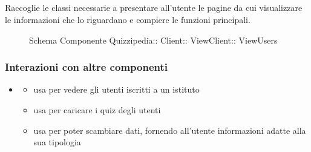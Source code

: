 \subsection{}
Raccoglie le classi necessarie a presentare all'utente le pagine da cui visualizzare le informazioni che lo riguardano e compiere le funzioni principali.
\begin{figure}[H]
\centering
\noindent{}
\caption[Schema Componente ViewUsers]{Schema Componente Quizzipedia:: Client:: ViewClient:: ViewUsers}
\end{figure}
\subsubsection{Interazioni con altre componenti}
\begin{itemize}
\item {}
\begin{itemize}
\item usa  per vedere gli utenti iscritti a un istituto
\item usa  per caricare i quiz degli utenti
\item usa  per poter scambiare dati, fornendo all'utente informazioni adatte alla sua tipologia
\end{itemize}
\end{itemize}

